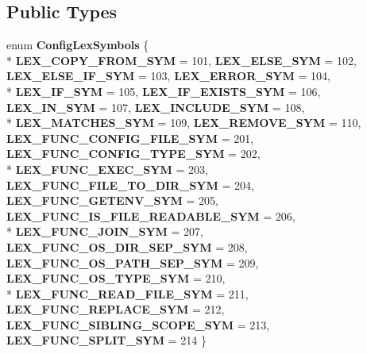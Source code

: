 \subsection*{Public Types}
\begin{DoxyCompactItemize}
\item 
enum {\bfseries Config\-Lex\-Symbols} \{ \\*
{\bfseries L\-E\-X\-\_\-\-C\-O\-P\-Y\-\_\-\-F\-R\-O\-M\-\_\-\-S\-Y\-M} = 101, 
{\bfseries L\-E\-X\-\_\-\-E\-L\-S\-E\-\_\-\-S\-Y\-M} = 102, 
{\bfseries L\-E\-X\-\_\-\-E\-L\-S\-E\-\_\-\-I\-F\-\_\-\-S\-Y\-M} = 103, 
{\bfseries L\-E\-X\-\_\-\-E\-R\-R\-O\-R\-\_\-\-S\-Y\-M} = 104, 
\\*
{\bfseries L\-E\-X\-\_\-\-I\-F\-\_\-\-S\-Y\-M} = 105, 
{\bfseries L\-E\-X\-\_\-\-I\-F\-\_\-\-E\-X\-I\-S\-T\-S\-\_\-\-S\-Y\-M} = 106, 
{\bfseries L\-E\-X\-\_\-\-I\-N\-\_\-\-S\-Y\-M} = 107, 
{\bfseries L\-E\-X\-\_\-\-I\-N\-C\-L\-U\-D\-E\-\_\-\-S\-Y\-M} = 108, 
\\*
{\bfseries L\-E\-X\-\_\-\-M\-A\-T\-C\-H\-E\-S\-\_\-\-S\-Y\-M} = 109, 
{\bfseries L\-E\-X\-\_\-\-R\-E\-M\-O\-V\-E\-\_\-\-S\-Y\-M} = 110, 
{\bfseries L\-E\-X\-\_\-\-F\-U\-N\-C\-\_\-\-C\-O\-N\-F\-I\-G\-\_\-\-F\-I\-L\-E\-\_\-\-S\-Y\-M} = 201, 
{\bfseries L\-E\-X\-\_\-\-F\-U\-N\-C\-\_\-\-C\-O\-N\-F\-I\-G\-\_\-\-T\-Y\-P\-E\-\_\-\-S\-Y\-M} = 202, 
\\*
{\bfseries L\-E\-X\-\_\-\-F\-U\-N\-C\-\_\-\-E\-X\-E\-C\-\_\-\-S\-Y\-M} = 203, 
{\bfseries L\-E\-X\-\_\-\-F\-U\-N\-C\-\_\-\-F\-I\-L\-E\-\_\-\-T\-O\-\_\-\-D\-I\-R\-\_\-\-S\-Y\-M} = 204, 
{\bfseries L\-E\-X\-\_\-\-F\-U\-N\-C\-\_\-\-G\-E\-T\-E\-N\-V\-\_\-\-S\-Y\-M} = 205, 
{\bfseries L\-E\-X\-\_\-\-F\-U\-N\-C\-\_\-\-I\-S\-\_\-\-F\-I\-L\-E\-\_\-\-R\-E\-A\-D\-A\-B\-L\-E\-\_\-\-S\-Y\-M} = 206, 
\\*
{\bfseries L\-E\-X\-\_\-\-F\-U\-N\-C\-\_\-\-J\-O\-I\-N\-\_\-\-S\-Y\-M} = 207, 
{\bfseries L\-E\-X\-\_\-\-F\-U\-N\-C\-\_\-\-O\-S\-\_\-\-D\-I\-R\-\_\-\-S\-E\-P\-\_\-\-S\-Y\-M} = 208, 
{\bfseries L\-E\-X\-\_\-\-F\-U\-N\-C\-\_\-\-O\-S\-\_\-\-P\-A\-T\-H\-\_\-\-S\-E\-P\-\_\-\-S\-Y\-M} = 209, 
{\bfseries L\-E\-X\-\_\-\-F\-U\-N\-C\-\_\-\-O\-S\-\_\-\-T\-Y\-P\-E\-\_\-\-S\-Y\-M} = 210, 
\\*
{\bfseries L\-E\-X\-\_\-\-F\-U\-N\-C\-\_\-\-R\-E\-A\-D\-\_\-\-F\-I\-L\-E\-\_\-\-S\-Y\-M} = 211, 
{\bfseries L\-E\-X\-\_\-\-F\-U\-N\-C\-\_\-\-R\-E\-P\-L\-A\-C\-E\-\_\-\-S\-Y\-M} = 212, 
{\bfseries L\-E\-X\-\_\-\-F\-U\-N\-C\-\_\-\-S\-I\-B\-L\-I\-N\-G\-\_\-\-S\-C\-O\-P\-E\-\_\-\-S\-Y\-M} = 213, 
{\bfseries L\-E\-X\-\_\-\-F\-U\-N\-C\-\_\-\-S\-P\-L\-I\-T\-\_\-\-S\-Y\-M} = 214
 \}
\end{DoxyCompactItemize}
